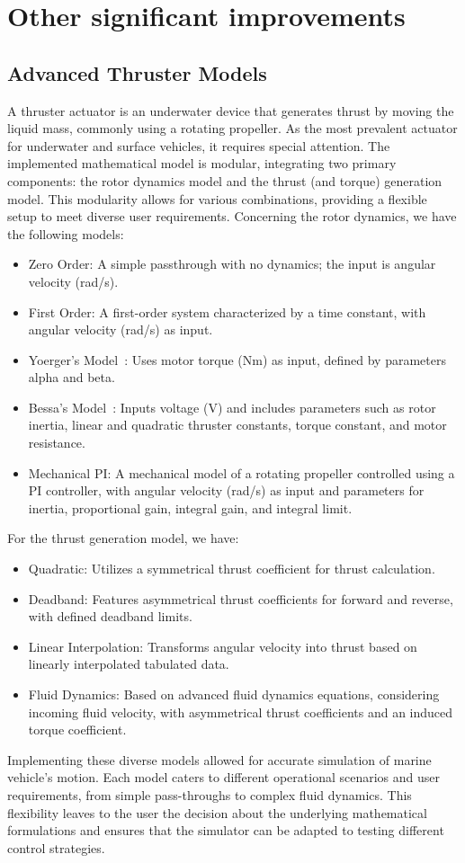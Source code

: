 \section{Other significant improvements}

\subsection{Advanced Thruster Models}
A thruster actuator is an underwater device that generates thrust by moving the liquid mass, commonly using a rotating propeller. As the most prevalent actuator for underwater and surface vehicles, it requires special attention. The implemented mathematical model is modular, integrating two primary components: the rotor dynamics model and the thrust (and torque) generation model. This modularity allows for various combinations, providing a flexible setup to meet diverse user requirements. 
Concerning the rotor dynamics, we have the following models:
\begin{itemize}
    \item Zero Order: A simple passthrough with no dynamics; the input is angular velocity (rad/s).
    \item First Order: A first-order system characterized by a time constant, with angular velocity (rad/s) as input.
    \item Yoerger’s Model~\cite{yoerger1990influence}: Uses motor torque (Nm) as input, defined by parameters alpha and beta.
    \item Bessa’s Model~\cite{bessa2005thruster}: Inputs voltage (V) and includes parameters such as rotor inertia, linear and quadratic thruster constants, torque constant, and motor resistance.
    \item Mechanical PI: A mechanical model of a rotating propeller controlled using a PI controller, with angular velocity (rad/s) as input and parameters for inertia, proportional gain, integral gain, and integral limit.
\end{itemize}
For the thrust generation model, we have:
\begin{itemize}
    \item Quadratic: Utilizes a symmetrical thrust coefficient for thrust calculation.
    \item Deadband: Features asymmetrical thrust coefficients for forward and reverse, with defined deadband limits.
    \item Linear Interpolation: Transforms angular velocity into thrust based on linearly interpolated tabulated data.
    \item Fluid Dynamics: Based on advanced fluid dynamics equations, considering incoming fluid velocity, with asymmetrical thrust coefficients and an induced torque coefficient.
\end{itemize}
Implementing these diverse models allowed for accurate simulation of marine vehicle's motion. Each model caters to different operational scenarios and user requirements, from simple pass-throughs to complex fluid dynamics. This flexibility leaves to the user the decision about the underlying mathematical formulations and ensures that the simulator can be adapted to testing different control strategies.
\vspace{-0.1cm}
